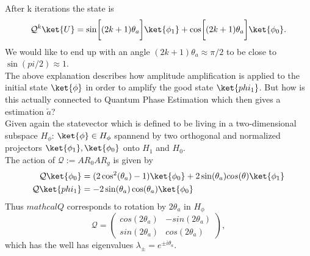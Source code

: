 \documentclass[../../main.tex]{subfiles}
\begin{document}
After k iterations the state is 
\begin{equation}\label{eq:Qktimes}
\mathcal{Q}^k \ket{U} = \sin \biggl[ (2k+1)\theta_a \biggr] \ket{\phi_1} + \cos \biggl[ (2k+1)\theta_a \biggr] \ket{\phi_0}.
\end{equation}
We would like to end up with an angle $(2k+1)\theta_a \approx \pi/2$ to be close to $\sin(pi/2) \approx 1$.\\
The above explanation describes how amplitude amplification is applied to the initial state $\ket{\phi}$ in order to amplify the good state $\ket{phi_1}$.
But how is this actually connected to Quantum Phase Estimation which then gives a estimation $\tilde{a}$?\\
Given again the statevector which is defined to be living in a two-dimensional subspace $H_{\phi}$: $\ket{\phi} \in H_{\phi}$ spannend by two orthogonal and normalized
projectors $\ket{\phi_1}, \ket{\phi_0}$ onto $H_1$ and $H_0$.\\
The action of $\mathcal{Q} := AR_0AR_g$ is given by
\begin{align}\label{eq:actionOfQ}
  \mathcal{Q} \ket{\phi_0} &= (2 \cos^2(\theta_a) - 1 )\ket{\phi_0} + 2 \sin(\theta_a)cos(\theta) \ket{\phi_1}\\
  \mathcal{Q} \ket{phi_1} &= -2 \sin(\theta_a) \cos(\theta_a) \ket{\phi_0} 
\end{align}
Thus $mathcal{Q}$ corresponds to rotation by $2\theta_a$ in $H_\phi$
\begin{equation}\label{eq:rotationMatrix}
  \mathcal{Q} = 
\begin{pmatrix}
      cos(2\theta_a) & -sin(2 \theta_a) \\
      sin(2\theta_a) & cos(2 \theta_a) 
\end{pmatrix},
\end{equation}
which has the well has eigenvalues $\lambda_{\pm} = e^{\pm i \theta_a}$.\\
\end{document}
